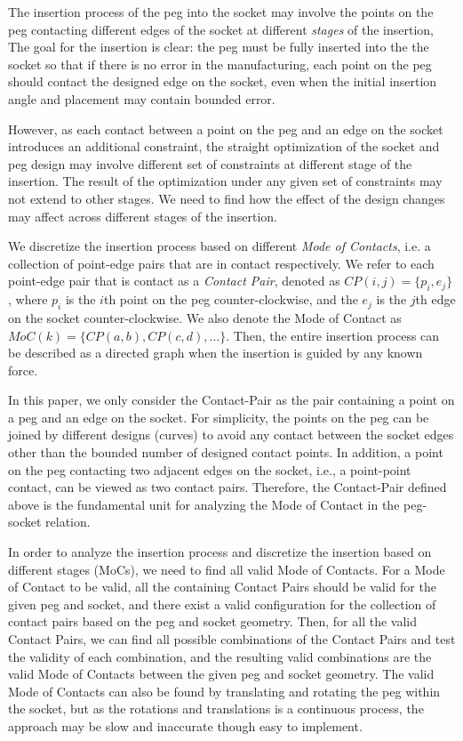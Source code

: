 The insertion process of the peg into the socket may involve the points on the peg contacting different edges of the socket at different {\em stages} of the insertion, The goal for the insertion is clear: the peg must be fully inserted into the the socket so that if there is no error in the manufacturing, each point on the peg should contact the designed edge on the socket, even when the initial insertion angle and placement may contain bounded error. 

However, as each contact between a point on the peg and an edge on the socket introduces an additional constraint, the straight optimization of the socket and peg design may involve different set of constraints at different stage of the insertion. The result of the optimization under any given set of constraints may not extend to other stages. We need to find how the effect of the design changes may affect across different stages of the insertion. 

We discretize the insertion process based on different {\em Mode of Contacts}, i.e. a collection of point-edge pairs that are in contact respectively. We refer to each point-edge pair that is contact as a {\em Contact Pair}, denoted as $CP(i, j) = \{p_i, e_j\}$, where $p_i$ is the $i$th point on the peg counter-clockwise, and the $e_j$ is the $j$th edge on the socket counter-clockwise. We also denote the Mode of Contact as $MoC(k) = \{CP(a, b), CP(c, d), \ldots\}$. Then, the entire insertion process can be described as a directed graph when the insertion is guided by any known force. 

In this paper, we only consider the Contact-Pair as the pair containing a point on a peg and an edge on the socket. For simplicity, the points on the peg can be joined by different designs (curves) to avoid any contact between the socket edges other than the bounded number of designed contact points. In addition, a point on the peg contacting two adjacent edges on the socket, i.e., a point-point contact, can be viewed as two contact pairs. Therefore, the Contact-Pair defined above is the fundamental unit for analyzing the Mode of Contact in the peg-socket relation. 


In order to analyze the insertion process and discretize the insertion based on different stages (MoCs), we need to find all valid Mode of Contacts. For a Mode of Contact to be valid, all the containing Contact Pairs should be valid for the given peg and socket, and there exist a valid configuration for the collection of contact pairs based on the peg and socket geometry. Then, for all the valid Contact Pairs, we can find all possible combinations of the Contact Pairs and test the validity of each combination, and the resulting valid combinations are the valid Mode of Contacts between the given peg and socket geometry. The valid Mode of Contacts can also be found by translating and rotating the peg within the socket, but as the rotations and translations is a continuous process, the approach may be slow and inaccurate though easy to implement. 

